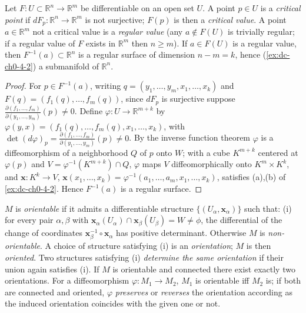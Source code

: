 \begin{example}
  \label{ex:dc-ch0-4-3}


  Let $F:U\subset\mathbb{R}^n\to\mathbb{R}^m$ be differentiable on an open set $U$.
  A point $p\in U$ is a \emph{critical point} if $dF_p:\mathbb{R}^n\to\mathbb{R}^m$ is
  not surjective; $F(p)$ is then a \emph{critical value}. A point $a\in\mathbb{R}^m$ not
  a critical value is a \emph{regular value} (any $a\notin F(U)$ is trivially regular; if
  a regular value of $F$ exists in $\mathbb{R}^m$ then $n\ge m$). If $a\in F(U)$ is
  a regular value, then $F^{-1}(a)\subset\mathbb{R}^n$ is a regular surface of
  dimension $n-m=k$, hence (\cref{ex:dc-ch0-4-2}) a submanifold of $\mathbb{R}^n$.
\end{example}
\begin{proof}
  \sketch
  For $p\in F^{-1}(a)$, writing $q=(y_1,\dots,y_m,x_1,\dots,x_k)$ and
  $F(q)=(f_1(q),\dots,f_m(q))$, since $dF_p$ is surjective suppose
  $\frac{\partial(f_1,\dots,f_m)}{\partial(y_1,\dots,y_m)}(p)\neq0$. Define
  $\varphi:U\to\mathbb{R}^{m+k}$ by
  $\varphi(y,x)=(f_1(q),\dots,f_m(q),x_1,\dots,x_k)$, with
  $\det(d\varphi)_p=\frac{\partial(f_1,\dots,f_m)}{\partial(y_1,\dots,y_m)}(p)\neq0$.
  By the inverse function theorem $\varphi$ is a diffeomorphism of a neighborhood
  $Q$ of $p$ onto $W$; with a cube $K^{m+k}$ centered at $\varphi(p)$ and
  $V=\varphi^{-1}(K^{m+k})\cap Q$, $\varphi$ maps $V$ diffeomorphically onto
  $K^m\times K^k$, and $\mathbf{x}:K^k\to V$,
  $\mathbf{x}(x_1,\dots,x_k)=\varphi^{-1}(a_1,\dots,a_m,x_1,\dots,x_k)$, satisfies
  (a),(b) of \cref{ex:dc-ch0-4-2}. Hence $F^{-1}(a)$ is a regular surface.
\end{proof}

\begin{definition}
  \label{def:dc-ch0-4-4}


  $M$ is \emph{orientable} if it admits a differentiable structure
  $\{(U_\alpha,\mathbf{x}_\alpha)\}$ such that:
  (i) for every pair $\alpha,\beta$ with
  $\mathbf{x}_\alpha(U_\alpha)\cap\mathbf{x}_\beta(U_\beta)=W\neq\phi$, the
  differential of the change of coordinates
  $\mathbf{x}_\beta^{-1}\circ\mathbf{x}_\alpha$ has positive determinant.
  Otherwise $M$ is \emph{non-orientable}. A choice of structure satisfying (i) is an
  \emph{orientation}; $M$ is then \emph{oriented}. Two structures satisfying (i) \emph{determine
  the same orientation} if their union again satisfies (i). If $M$ is orientable and
  connected there exist exactly two orientations. For a diffeomorphism
  $\varphi:M_1\to M_2$, $M_1$ is orientable iff $M_2$ is; if both are connected and
  oriented, $\varphi$ \emph{preserves} or \emph{reverses} the orientation according as the
  induced orientation coincides with the given one or not.
\end{definition}


